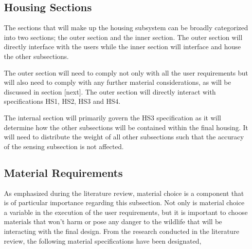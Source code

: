 \documentclass[class=report,11pt,crop=false]{standalone}
\begin{document}
\subsection{Housing Sections}
The sections that will make up the housing subsystem can be broadly categorized into two sections; the outer section and the inner section. The outer section will directly interface with the users while the inner section will interface and house the other subsections. 

The outer section will need to comply not only with all the user requirements but will also need to comply with any further material considerations, as will be discussed in section [next]. The outer section will directly interact with specifications HS1, HS2, HS3 and HS4.

The internal section will primarily govern the HS3 specification as it will determine how the other subsections will be contained within the final housing. It will need to distribute the weight of all other subsections such that the accuracy of the sensing subsection is not affected.

\subsection{Material Requirements}
As emphasized during the literature review, material choice is a component that is of particular importance regarding this subsection. Not only is material choice a variable in the execution of the user requirements, but it is important to choose materials that won’t harm or pose any danger to the wildlife that will be interacting with the final design. From the research conducted in the literature review, the following material specifications have been designated,
\end{document}
